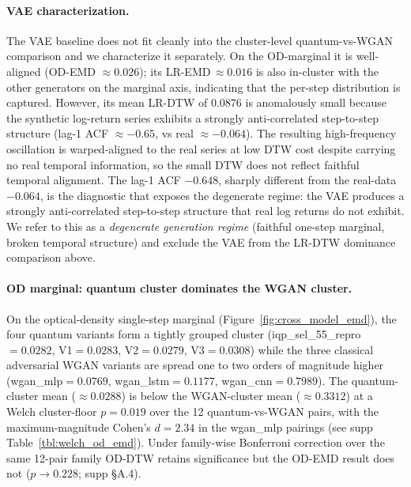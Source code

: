 \documentclass[12pt,twocolumn]{article}
\begin{document}
\paragraph{VAE characterization.}
The VAE baseline does not fit cleanly into the cluster-level
quantum-vs-WGAN comparison and we characterize it separately. On the
OD-marginal it is well-aligned (OD-EMD $\approx 0.026$); its
LR-EMD$\,\approx 0.016$ is also in-cluster with the other generators on
the marginal axis, indicating that the per-step distribution is
captured. However, its mean LR-DTW of $0.0876$ is anomalously small
because the synthetic log-return series exhibits a strongly
anti-correlated step-to-step structure (lag-1 ACF $\approx -0.65$,
vs real $\approx -0.064$). The resulting high-frequency oscillation
is warped-aligned to the real series at low DTW cost despite
carrying no real temporal information, so the small DTW does not
reflect faithful temporal alignment.
The lag-1 ACF $-0.648$, sharply different from the real-data
$-0.064$, is the diagnostic that exposes the degenerate regime: the VAE
produces a strongly anti-correlated step-to-step structure that real
log returns do not exhibit. We refer to this as a \emph{degenerate
generation regime} (faithful one-step marginal, broken temporal
structure) and exclude the VAE from the LR-DTW dominance comparison
above.

\paragraph{OD marginal: quantum cluster dominates the WGAN cluster.}
On the optical-density single-step marginal
(Figure~\ref{fig:cross_model_emd}), the four quantum variants form a
tightly grouped cluster
(iqp\_sel\_55\_repro$=0.0282$, V1$=0.0283$, V2$=0.0279$,
V3$=0.0308$) while the three classical adversarial WGAN variants are
spread one to two orders of magnitude higher
(wgan\_mlp$=0.0769$, wgan\_lstm$=0.1177$, wgan\_cnn$=0.7989$). The
quantum-cluster mean ($\approx 0.0288$) is below the WGAN-cluster mean
($\approx 0.3312$) at a Welch cluster-floor $p = 0.019$ over the 12
quantum-vs-WGAN pairs, with the maximum-magnitude Cohen's $d = 2.34$ in
the wgan\_mlp pairings (see supp Table~\ref{tbl:welch_od_emd}). Under
family-wise Bonferroni correction over the same 12-pair family OD-DTW
retains significance but the OD-EMD result does not ($p \to 0.228$; supp
\S A.4).
\end{document}
